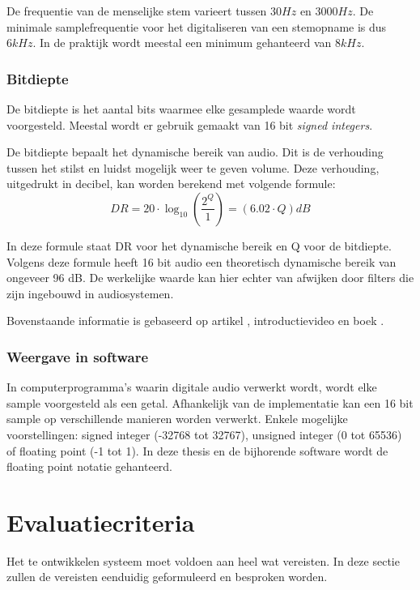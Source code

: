 De frequentie van de menselijke stem varieert tussen $ 30 Hz $ en $ 3000 Hz $. De minimale samplefrequentie voor het digitaliseren van een stemopname is dus $ 6kHz $. In de praktijk wordt meestal een minimum gehanteerd van $ 8kHz $.

\subsubsection{Bitdiepte}

De bitdiepte is het aantal bits waarmee elke gesamplede waarde wordt voorgesteld. Meestal wordt er gebruik gemaakt van 16 bit \textit{signed integers}.

De bitdiepte bepaalt het dynamische bereik van audio. Dit is de verhouding tussen het stilst en luidst mogelijk weer te geven volume. Deze verhouding, uitgedrukt in decibel, kan worden berekend met volgende formule: 
\begin{equation}
DR = 20 \cdot \log_{10} \left(\frac{2^Q}{1}\right) = (6.02 \cdot Q) dB
\end{equation}

In deze formule staat DR voor het dynamische bereik en Q voor de bitdiepte. Volgens deze formule heeft 16 bit audio een theoretisch dynamische bereik van ongeveer 96 dB. De werkelijke waarde kan hier echter van afwijken door filters die zijn ingebouwd in audiosystemen.

Bovenstaande informatie is gebaseerd op artikel \cite{tarsosmanual2016}, introductievideo \cite{xiph2016} en boek \cite{fries2005digital}.

\subsubsection{Weergave in software}

In computerprogramma's waarin digitale audio verwerkt wordt, wordt elke sample voorgesteld als een getal. Afhankelijk van de implementatie kan een 16 bit sample op verschillende manieren worden verwerkt. Enkele mogelijke voorstellingen: signed integer (-32768 tot 32767), unsigned integer (0 tot 65536) of floating point (-1 tot 1). 
In deze thesis en de bijhorende software wordt de floating point notatie gehanteerd.

\section{Evaluatiecriteria}
\label{evaluatie-criteria}

Het te ontwikkelen systeem moet voldoen aan heel wat vereisten. In deze sectie zullen de vereisten eenduidig geformuleerd en besproken worden.  

